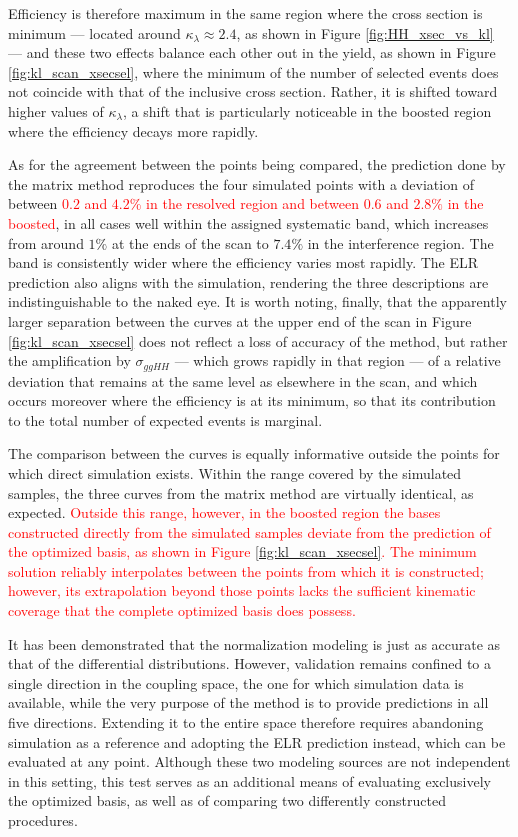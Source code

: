 Efficiency is therefore maximum in the same region where the cross section is minimum — located around $\kappa_\lambda\approx2.4$, as shown in Figure \ref{fig:HH_xsec_vs_kl} — and these two effects balance each other out in the yield, as shown in Figure \ref{fig:kl_scan_xsecsel}, where the minimum of the number of selected events does not coincide with that of the inclusive cross section. Rather, it is shifted toward higher values of $\kappa_\lambda$, a shift that is particularly noticeable in the boosted region where the efficiency decays more rapidly.

As for the agreement between the points being compared, the prediction done by the matrix method reproduces the four simulated points with a deviation of between \textcolor{red}{$0.2$ and $4.2\%$ in the resolved region and between $0.6$ and $2.8\%$ in the boosted}, in all cases well within the assigned systematic band, which increases from around $1\%$ at the ends of the scan to $7.4\%$ in the interference region. The band is consistently wider where the efficiency varies most rapidly. The ELR prediction also aligns with the simulation, rendering the three descriptions are indistinguishable to the naked eye. It is worth noting, finally, that the apparently larger separation between the curves at the upper end of the scan in Figure \ref{fig:kl_scan_xsecsel} does not reflect a loss of accuracy of the method, but rather the amplification by $\sigma_{ggHH}$ — which grows rapidly in that region — of a relative deviation that remains at the same level as elsewhere in the scan, and which occurs moreover where the efficiency is at its minimum, so that its contribution to the total number of expected events is marginal.

The comparison between the curves is equally informative outside the points for which direct simulation exists. Within the range covered by the simulated samples, the three curves from the matrix method are virtually identical, as expected. \textcolor{red}{Outside this range, however, in the boosted region the bases constructed directly from the simulated samples deviate from the prediction of the optimized basis, as shown in Figure \ref{fig:kl_scan_xsecsel}. The minimum solution reliably interpolates between the points from which it is constructed; however, its extrapolation beyond those points lacks the sufficient kinematic coverage that the complete optimized basis does possess.}\medskip

It has been demonstrated that the normalization modeling is just as accurate as that of the differential distributions. However, validation remains confined to a single direction in the coupling space, the one for which simulation data is available, while the very purpose of the method is to provide predictions in all five directions. Extending it to the entire space therefore requires abandoning simulation as a reference and adopting the ELR prediction instead, which can be evaluated at any point. Although these two modeling sources are not independent in this setting, this test serves as an additional means of evaluating exclusively the optimized basis, as well as of comparing two differently constructed procedures.

